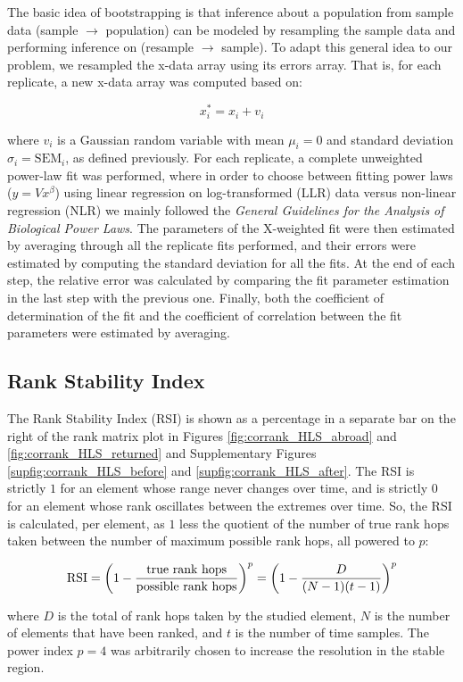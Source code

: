 The basic idea of bootstrapping is that inference about a population from sample data (sample $\rightarrow$ population) can be modeled by resampling the sample data and performing inference on (resample $\rightarrow$ sample)\cite{boot}. To adapt this general idea to our problem, we resampled the x-data array using its errors array. That is, for each replicate, a new x-data array was computed based on:
\begin{linenomath}
$$x^*_i = x_i + v_i$$
\end{linenomath}
where $v_i$ is a Gaussian random variable with mean $\mu_i=0$ and standard deviation $\sigma_i=\mathrm{SEM}_i$, as defined previously. For each replicate, a complete unweighted power-law fit was performed, where in order to choose between fitting power laws ($y=Vx^\beta$) using linear regression on log-transformed (LLR) data versus non-linear regression (NLR) we mainly followed the \emph{General Guidelines for the Analysis of Biological Power Laws}\cite{biopwrlaw}. The parameters of the X-weighted fit were then estimated by averaging through all the replicate fits performed, and their errors were estimated by computing the standard deviation for all the fits. At the end of each step, the relative error was calculated by comparing the fit parameter estimation in the last step with the previous one. Finally, both the coefficient of determination of the fit and the coefficient of correlation between the fit parameters were estimated by averaging.

\subsection*{Rank Stability Index}\label{sec:RSI}

The Rank Stability Index (RSI) is shown as a percentage in a separate bar on the right of the rank matrix plot in Figures \ref{fig:corrank_HLS_abroad} and \ref{fig:corrank_HLS_returned} and Supplementary Figures \ref{supfig:corrank_HLS_before} and \ref{supfig:corrank_HLS_after}. The RSI is strictly $1$ for an element whose range never changes over time, and is strictly $0$ for an element whose rank oscillates between the extremes over time. So, the RSI is calculated, per element, as $1$ less the quotient of the number of true rank hops taken between the number of maximum possible rank hops, all powered to $p$:
\begin{linenomath}
$${\rm RSI} = \left(1-\frac{\text{true rank hops}}{\text{possible rank hops}}\right)^p = \left(1-\frac{D}{(N-1)(t-1)}\right)^p$$
\end{linenomath}
where $D$ is the total of rank hops taken by the studied element, $N$ is the number of elements that have been ranked, and $t$ is the number of time samples. The power index $p=4$ was arbitrarily chosen to increase the resolution in the stable region. 

